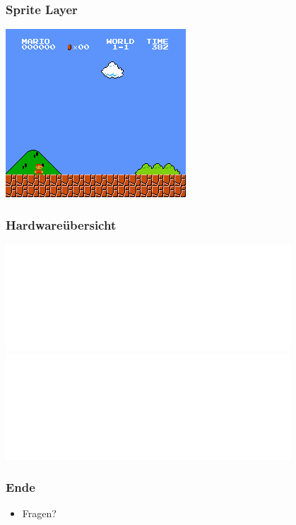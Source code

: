 \documentclass{beamer}
\begin{document}
    
    \begin{frame}
        \frametitle{Sprite Layer}
        \includegraphics[width=0.8\linewidth]{img/smb_sprite.png}
    \end{frame}    
    
    \begin{frame}
        \frametitle{Hardwareübersicht}
        \includegraphics<2>[width=0.8\textwidth]{img/system2.pdf}
        \includegraphics<3>[width=0.8\textwidth]{img/system3.pdf}
    \end{frame}
    
   
    \begin{frame}
        \frametitle{Ende}
        \begin{itemize}
            \item{Fragen?}
        \end{itemize}
    \end{frame}
    
\end{document}
